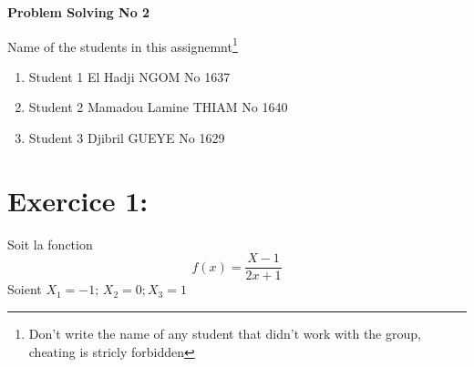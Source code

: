 \documentclass[a4paper,12pt]{article}
\newcommand{\Title}{Problem Solving No 2}
\newcommand{\Createtitle}{
\vspace*{-4mm}
\begin{center}
\begin{Huge}
\textbf{\Title}\vspace{5mm}\\
\end{Huge}
\end{center}
}
\begin{document}
\Createtitle

Name of the students in this assignemnt\footnote{Don't write the name of any student that didn't work with the group, cheating is stricly forbidden}
\begin{enumerate}
\item Student 1  El Hadji NGOM No 1637
\item Student 2  Mamadou Lamine THIAM No 1640
\item Student 3  Djibril GUEYE No 1629
\end{enumerate}

\section{Exercice 1:}

Soit la fonction \[f(x)=\frac{X-1}{2x+1}\]Soient $X_{1}=-1$; $X_{2}=0; X_{3}=1$ \\
\end{document}
